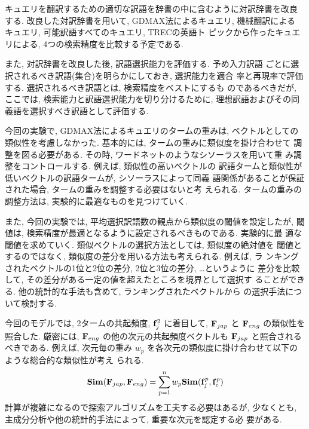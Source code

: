 
キュエリを翻訳するための適切な訳語を辞書の中に含むように対訳辞書を改良
する. 改良した対訳辞書を用いて, GDMAX法によるキュエリ, 機械翻訳による
キュエリ, 可能訳語すべてのキュエリ, TRECの英語ト
ピックから作ったキュエリによる, 4つの検索精度を比較する予定である. 

また, 対訳辞書を改良した後, 訳語選択能力を評価する. 予め入力訳語
ごとに選択されるべき訳語(集合)を明らかにしておき, 選択能力を適合
率と再現率で評価する. 選択されるべき訳語とは, 検索精度をベストにするも
のであるべきだが, ここでは, 検索能力と訳語選択能力を切り分けるために, 
理想訳語およびその同義語を選択すべき訳語として評価する. 


今回の実験で, GDMAX法によるキュエリのタームの重みは, ベクトルとしての
類似性を考慮しなかった. 基本的には, タームの重みに類似度を掛け合わせて
調整を図る必要がある. その時, ワードネットのようなシソーラスを用いて重
み調整をコントロールする\cite{WORDNET}. 例えば, 類似性の高いベクトルの
訳語タームと類似性が低いベクトルの訳語タームが, シソーラスによって同義
語関係があることが保証された場合, タームの重みを調整する必要はないと考
えられる. タームの重みの調整方法は, 実験的に最適なものを見つけていく. 

また, 今回の実験では, 平均選択訳語数の観点から類似度の閾値を設定したが, 
閾値は, 検索精度が最適となるように設定されるべきものである. 実験的に最
適な閾値を求めていく. 類似ベクトルの選択方法としては, 類似度の絶対値を
閾値とするのではなく, 類似度の差分を用いる方法も考えられる. 例えば, ラ
ンキングされたベクトルの1位と2位の差分, 2位と3位の差分, …というように
差分を比較して, その差分がある一定の値を超えたところを境界として選択す
ることができる. 他の統計的な手法も含めて, ランキングされたベクトルから
の選択手法について検討する. 



今回のモデルでは, 2タームの共起頻度, ${\bf f}_{j}^{2}$ に着目して, 
${\bf F}_{jap}$ と ${\bf F}_{eng}$ の類似性を照合した.  厳密には, 
${\bf F}_{eng}$ の他の次元の共起頻度ベクトルも
${\bf F}_{jap}$ と照合されるべきである. 例えば, 次元毎の重み
$w_{p}$ を各次元の類似度に掛け合わせて以下のような総合的な類似性が考え
られる. 
  \begin{eqnarray*}
{\bf Sim}({\bf F}_{jap},{\bf F}_{eng}) = 
\sum_{p = 1}^{n} {w}_{p}{{\bf Sim}({\bf f}_{j}^{p},{\bf f}_{e}^{p})}
\end{eqnarray*}
計算が複雑になるので探索アルゴリズムを工夫する必要はあるが, 
少なくとも, 主成分分析や他の統計的手法によって, 重要な次元を認定する必
要がある. 


